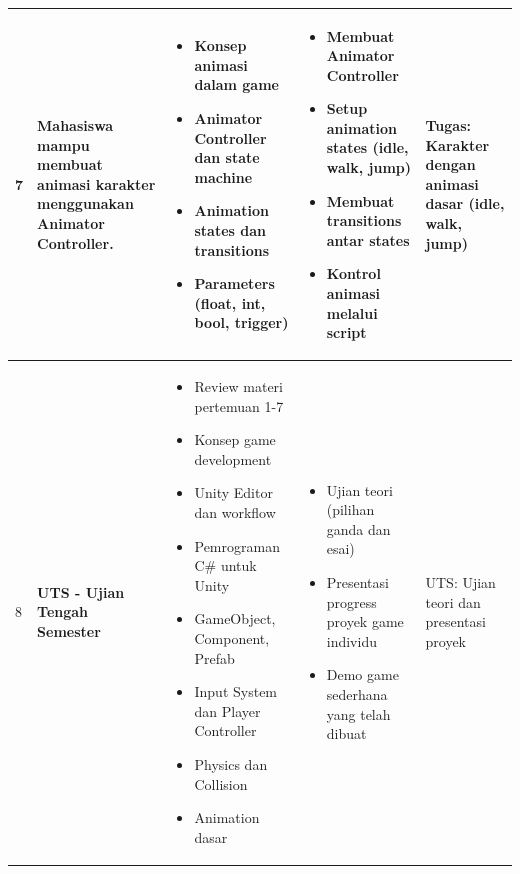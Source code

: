 \documentclass[a4paper,12pt]{article}
\begin{document}
\begin{longtable}{|p{0.8cm}|p{3.5cm}|p{4cm}|p{4cm}|p{2.5cm}|}
7 & Mahasiswa mampu membuat animasi karakter menggunakan Animator Controller. & 
\begin{itemize}[leftmargin=*,nosep]
\item Konsep animasi dalam game
\item Animator Controller dan state machine
\item Animation states dan transitions
\item Parameters (float, int, bool, trigger)
\end{itemize} & 
\begin{itemize}[leftmargin=*,nosep]
\item Membuat Animator Controller
\item Setup animation states (idle, walk, jump)
\item Membuat transitions antar states
\item Kontrol animasi melalui script
\end{itemize} & 
Tugas: Karakter dengan animasi dasar (idle, walk, jump) \\
\hline

8 & \textbf{UTS - Ujian Tengah Semester} & 
\begin{itemize}[leftmargin=*,nosep]
\item Review materi pertemuan 1-7
\item Konsep game development
\item Unity Editor dan workflow
\item Pemrograman C\# untuk Unity
\item GameObject, Component, Prefab
\item Input System dan Player Controller
\item Physics dan Collision
\item Animation dasar
\end{itemize} & 
\begin{itemize}[leftmargin=*,nosep]
\item Ujian teori (pilihan ganda dan esai)
\item Presentasi progress proyek game individu
\item Demo game sederhana yang telah dibuat
\end{itemize} & 
UTS: Ujian teori dan presentasi proyek \\
\hline


\end{longtable}
\end{document}
